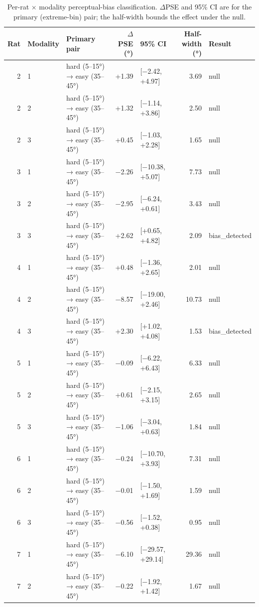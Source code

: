 \begin{table}[htbp]
  \centering
  \caption{Per-rat $\times$ modality perceptual-bias classification. $\Delta$PSE and 95\% CI are for the primary (extreme-bin) pair; the half-width bounds the effect under the null.}
  \label{tab:perceptual_bias_summary}
  \begin{tabular}{rllrlrl}
    \toprule
    Rat & Modality & Primary pair & $\Delta$PSE (°) & 95\% CI & Half-width (°) & Result \\
    \midrule
    2 & 1 & hard (5–15°) → easy (35–45°) & +1.39 & [−2.42, +4.97] & 3.69 & null \\
    2 & 2 & hard (5–15°) → easy (35–45°) & +1.32 & [−1.14, +3.86] & 2.50 & null \\
    2 & 3 & hard (5–15°) → easy (35–45°) & +0.45 & [−1.03, +2.28] & 1.65 & null \\
    3 & 1 & hard (5–15°) → easy (35–45°) & −2.26 & [−10.38, +5.07] & 7.73 & null \\
    3 & 2 & hard (5–15°) → easy (35–45°) & −2.95 & [−6.24, +0.61] & 3.43 & null \\
    3 & 3 & hard (5–15°) → easy (35–45°) & +2.62 & [+0.65, +4.82] & 2.09 & bias\_detected \\
    4 & 1 & hard (5–15°) → easy (35–45°) & +0.48 & [−1.36, +2.65] & 2.01 & null \\
    4 & 2 & hard (5–15°) → easy (35–45°) & −8.57 & [−19.00, +2.46] & 10.73 & null \\
    4 & 3 & hard (5–15°) → easy (35–45°) & +2.30 & [+1.02, +4.08] & 1.53 & bias\_detected \\
    5 & 1 & hard (5–15°) → easy (35–45°) & −0.09 & [−6.22, +6.43] & 6.33 & null \\
    5 & 2 & hard (5–15°) → easy (35–45°) & +0.61 & [−2.15, +3.15] & 2.65 & null \\
    5 & 3 & hard (5–15°) → easy (35–45°) & −1.06 & [−3.04, +0.63] & 1.84 & null \\
    6 & 1 & hard (5–15°) → easy (35–45°) & −0.24 & [−10.70, +3.93] & 7.31 & null \\
    6 & 2 & hard (5–15°) → easy (35–45°) & −0.01 & [−1.50, +1.69] & 1.59 & null \\
    6 & 3 & hard (5–15°) → easy (35–45°) & −0.56 & [−1.52, +0.38] & 0.95 & null \\
    7 & 1 & hard (5–15°) → easy (35–45°) & −6.10 & [−29.57, +29.14] & 29.36 & null \\
    7 & 2 & hard (5–15°) → easy (35–45°) & −0.22 & [−1.92, +1.42] & 1.67 & null \\

\end{tabular}
\end{table}
